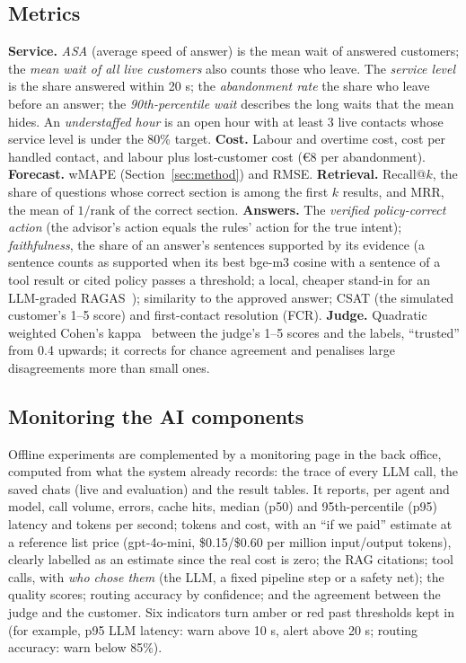 \subsection{Metrics}
\textbf{Service.} \emph{ASA} (average speed of answer) is the mean wait of answered customers; the
\emph{mean wait of all live customers} also counts those who leave. The \emph{service level} is the share
answered within 20 s; the \emph{abandonment rate} the share who leave before an answer; the
\emph{90th-percentile wait} describes the long waits that the mean hides. An \emph{understaffed hour} is an open
hour with at least 3 live contacts whose service level is under the 80\% target.
\textbf{Cost.} Labour and overtime cost, cost per handled contact, and labour plus lost-customer cost
(€8 per abandonment). \textbf{Forecast.} wMAPE (Section~\ref{sec:method}) and RMSE. \textbf{Retrieval.}
Recall@$k$, the share of questions whose correct section is among the first $k$ results, and MRR, the mean of
$1/\text{rank}$ of the correct section. \textbf{Answers.} The \emph{verified policy-correct action} (the
advisor's action equals the rules' action for the true intent); \emph{faithfulness}, the share of an answer's
sentences supported by its evidence (a sentence counts as supported when its best bge-m3 cosine with a
sentence of a tool result or cited policy passes a threshold; a local, cheaper stand-in for an LLM-graded
RAGAS~\cite{ragas}); similarity to the approved answer; CSAT (the simulated customer's 1--5 score) and
first-contact resolution (FCR). \textbf{Judge.} Quadratic weighted Cohen's kappa~\cite{cohen} between the
judge's 1--5 scores and the labels, ``trusted'' from 0.4 upwards; it corrects for chance agreement and
penalises large disagreements more than small ones.

\subsection{Monitoring the AI components}
\label{sec:monitoringmethod}
Offline experiments are complemented by a monitoring page in the back office, computed from what the system
already records: the trace of every LLM call, the saved chats (live and evaluation) and the result tables. It
reports, per agent and model, call volume, errors, cache hits, median (p50) and 95th-percentile (p95)
latency and tokens per second; tokens and cost, with an ``if we paid'' estimate at a reference list price
(gpt-4o-mini, \$0.15/\$0.60 per million input/output tokens), clearly labelled as an estimate since the
real cost is zero; the RAG citations; tool calls, with \emph{who chose them} (the LLM, a fixed pipeline step or a
safety net); the quality scores; routing accuracy by confidence; and the agreement between the judge and the
customer. Six indicators turn amber or red past thresholds kept in  (for example,
p95 LLM latency: warn above 10 s, alert above 20 s; routing accuracy: warn below 85\%).
